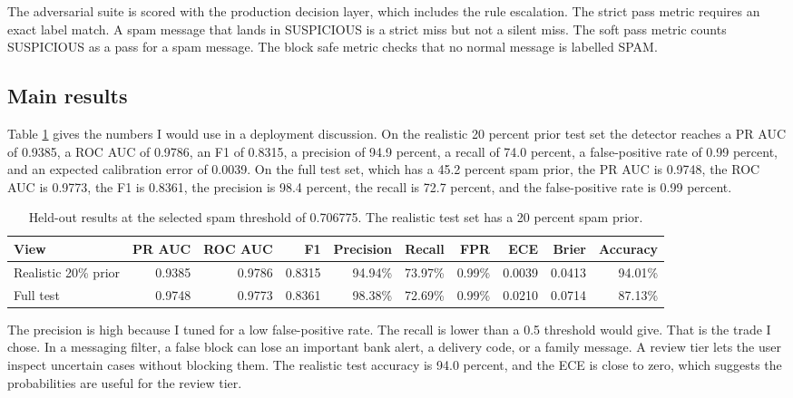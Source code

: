 \documentclass[11pt]{article}
\begin{document}
The adversarial suite is scored with the production decision layer, which includes the rule escalation. The strict pass metric requires an exact label match. A spam message that lands in SUSPICIOUS is a strict miss but not a silent miss. The soft pass metric counts SUSPICIOUS as a pass for a spam message. The block safe metric checks that no normal message is labelled SPAM.

\subsection{Main results}

Table \ref{tab:main} gives the numbers I would use in a deployment discussion. On the realistic 20 percent prior test set the detector reaches a PR AUC of 0.9385, a ROC AUC of 0.9786, an F1 of 0.8315, a precision of 94.9 percent, a recall of 74.0 percent, a false-positive rate of 0.99 percent, and an expected calibration error of 0.0039. On the full test set, which has a 45.2 percent spam prior, the PR AUC is 0.9748, the ROC AUC is 0.9773, the F1 is 0.8361, the precision is 98.4 percent, the recall is 72.7 percent, and the false-positive rate is 0.99 percent.

\begin{table}[htbp]
\centering
\small
\caption{Held-out results at the selected spam threshold of 0.706775. The realistic test set has a 20 percent spam prior.}
\label{tab:main}
\begin{tabularx}{\textwidth}{Xrrrrrrrrr}
\toprule
View & PR AUC & ROC AUC & F1 & Precision & Recall & FPR & ECE & Brier & Accuracy \\
\midrule
Realistic 20\% prior & 0.9385 & 0.9786 & 0.8315 & 94.94\% & 73.97\% & 0.99\% & 0.0039 & 0.0413 & 94.01\% \\
Full test & 0.9748 & 0.9773 & 0.8361 & 98.38\% & 72.69\% & 0.99\% & 0.0210 & 0.0714 & 87.13\% \\
\bottomrule
\end{tabularx}
\end{table}

The precision is high because I tuned for a low false-positive rate. The recall is lower than a 0.5 threshold would give. That is the trade I chose. In a messaging filter, a false block can lose an important bank alert, a delivery code, or a family message. A review tier lets the user inspect uncertain cases without blocking them. The realistic test accuracy is 94.0 percent, and the ECE is close to zero, which suggests the probabilities are useful for the review tier.
\end{document}
